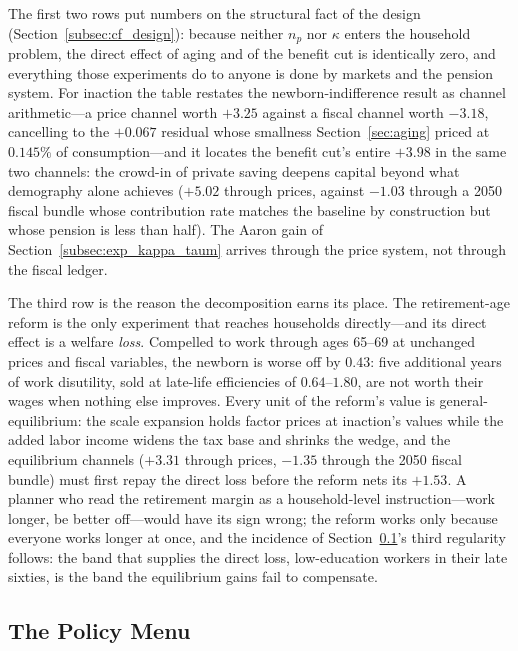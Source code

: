 \documentclass[12pt,a4paper]{article}
\begin{document}
The first two rows put numbers on the structural fact of the design (Section~\ref{subsec:cf_design}): because neither $n_p$ nor $\kappa$ enters the household problem, the direct effect of aging and of the benefit cut is identically zero, and everything those experiments do to anyone is done by markets and the pension system. For inaction the table restates the newborn-indifference result as channel arithmetic---a price channel worth $+3.25$ against a fiscal channel worth $-3.18$, cancelling to the $+0.067$ residual whose smallness Section~\ref{sec:aging} priced at $0.145\%$ of consumption---and it locates the benefit cut's entire $+3.98$ in the same two channels: the crowd-in of private saving deepens capital beyond what demography alone achieves ($+5.02$ through prices, against $-1.03$ through a 2050 fiscal bundle whose contribution rate matches the baseline by construction but whose pension is less than half). The Aaron gain of Section~\ref{subsec:exp_kappa_taum} arrives through the price system, not through the fiscal ledger.

The third row is the reason the decomposition earns its place. The retirement-age reform is the only experiment that reaches households directly---and its direct effect is a welfare \emph{loss}. Compelled to work through ages 65--69 at unchanged prices and fiscal variables, the newborn is worse off by $0.43$: five additional years of work disutility, sold at late-life efficiencies of $0.64$--$1.80$, are not worth their wages when nothing else improves. Every unit of the reform's value is general-equilibrium: the scale expansion holds factor prices at inaction's values while the added labor income widens the tax base and shrinks the wedge, and the equilibrium channels ($+3.31$ through prices, $-1.35$ through the 2050 fiscal bundle) must first repay the direct loss before the reform nets its $+1.53$. A planner who read the retirement margin as a household-level instruction---work longer, be better off---would have its sign wrong; the reform works only because everyone works longer at once, and the incidence of Section~\ref{subsec:cf_menu}'s third regularity follows: the band that supplies the direct loss, low-education workers in their late sixties, is the band the equilibrium gains fail to compensate.

\subsection{The Policy Menu}
\label{subsec:cf_menu}
\end{document}
